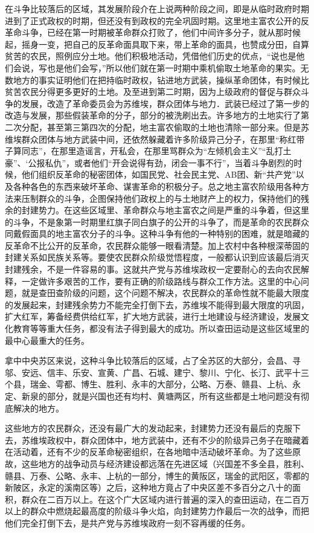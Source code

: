 在斗争比较落后的区域，其发展阶段介在上说两种阶段之间，即是从临时政府时期进到了正式政权的时期，但还没有到政权的完全巩固时期。这里地主富农公开的反革命斗争，已经在第一时期被革命群众打败了，他们中间许多分子，就从那时候起，摇身一变，把自己的反革命面具取下来，带上革命的面具，也赞成分田，自算贫苦的农民，照例应分土地。他们积极地活动，凭借他们历史的优点，“说也是他们会说，写也是他们会写，”所以他们就在第一时期中乘机偷取土地革命的果实。无数地方的事实证明他们在把持临时政权，钻进地方武装，操纵革命团体，有时候比贫苦农民分得更多更好的土地。及至进到第二时期，因为上级政府的督促与群众斗争的发展，改造了革命委员会为苏维埃，群众团体与地力．武装已经过了第一步的改造与发展，那些假装革命的分子，部分的被洗刷出去。许多地方的土地实行了第二次分配，甚至第三第四次的分配，地主富农偷取的土地也清除一部分来。但是苏维埃群众团体与地方武装中间，还依然躲藏着许多阶级异己分子，在那里“称红带子算同志”，在那里造谣言，开私会，在那里骂群众为“左倾机会主义”“乱打土豪”、‘公报私仇”，或者他们“开会说得有劲，闭会一事不行”，当着斗争剧烈的时候，他们组织反革命的秘密团体，如国民党、社会民主党、AB团、新“共产党”以及各种各色的东西来破坏革命、谋害革命的积极分子。总之地主富农阶级用各种方法来压制群众的斗争，企图保持他们政权上的与土地财产上的权力，保持他们的残余的封建势力。在这些区域里、革命群众与地主富农之间是严重的斗争着，但这里的斗争，不是象第一时期里红旗子同白旗子的公开的斗争了，而是革命的农民群众同戴假面具的地主富农分子的斗争。这种斗争有他的一种特别的困难，就是暗藏的反革命不比公开的反革命，农民群众能够一眼看清楚。加上农村中各种根深蒂固的封建关系如民族关系等。要使农民群众阶级觉悟程度，一般都认识到应该最后消灭封建残余，不是一件容易的事。这就共产党与苏维埃政权一定要耐心的去向农民解释，一定做许多艰苦的工作，要有正确的阶级路线与群众工作方法。这里的中心问题，就是查田查阶级的问题，这个问题不解决，农民群众的革命性就不能最大限度的发展起来，封建残余势力不能完全打倒下去，苏维埃不能得到最大限度的巩固，扩大红军，筹备经费供给红军，扩大地方武装，进行土地建设与经济建设，发展文化教育等等重大任务，都没有法子得到最大的成功。所以查田运动是这些区域里的最中心最重大的任务。

拿中中央苏区来说，这种斗争比较落后的区域，占了全苏区的大部分，会昌、寻邬、安远、信丰、乐安、宣黄、广昌、石城、建宁、黎川、宁化、长汀、武平十三个县，瑞金、雩都、博生、胜利、永丰的大部分，公略、万泰、赣县、上杭、永定、新泉的部分，就是兴国也还有均村、黄塘两区，所有这些都是土地问题没有彻底解决的地方。

这些地方的农民群众，还没有最广大的发动起来，封建势力还没有最后的克服下去，苏维埃政权中，群众团体中，地方武装中，还有不少的阶级异己务子在暗藏着在活动着，还有不少的反革命秘密组织，在各地暗中活动破坏革命。为了这些原故，这些地方的战争动员与经济建设都远落在先进区域（兴国差不多全县，胜利、赣县、万泰、公略、永丰、上杭的一部分，博生的黄阪区，瑞金的武阳区，零都的新陂区，永定的溪南区等）之后，这种地方竟占了中央区差不多百分之八十的面积，群众在二百万以上。在这个广大区域内进行普遍的深入的查田运动，在二百万以上的群众中燃烧起最高度的阶级斗争火焰，向封建势力作最后一次的战争，而把他们完全打倒下去，是共产党与苏维埃政府一刻不容再缓的任务。

